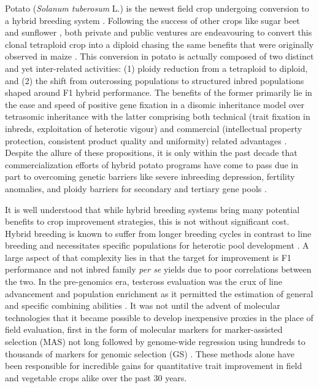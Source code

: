 Potato (\emph{Solanum tuberosum} L.) is the newest field crop
undergoing conversion to a hybrid breeding system
\autocite{DeVries2023,Jansky2016}. Following the success of other crops
like sugar beet \autocite{McGrath2018} and sunflower
\autocite{Dimitrijevic2018}, both private and public ventures are
endeavouring to convert this clonal tetraploid crop into a diploid
chasing the same benefits that were originally observed in maize
\autocite{Duvick1997}. This conversion in potato is actually composed of
two distinct and yet inter-related activities: (1) ploidy reduction from
a tetraploid to diploid, and (2) the shift from outcrossing populations
to structured inbred populations shaped around F1 hybrid performance.
The benefits of the former primarily lie in the ease and speed of
positive gene fixation in a disomic inheritance model over tetrasomic
inheritance \autocite{Hougas1958} with the latter comprising both
technical (trait fixation in inbreds, exploitation of heterotic vigour)
and commercial (intellectual property protection, consistent product
quality and uniformity) related advantages \autocite{Wright1980}.
Despite the allure of these propositions, it is only within the past
decade that commercialization efforts of hybrid potato programs have
come to pass due in part to overcoming genetic barriers like severe
inbreeding depression, fertility anomalies, and ploidy barriers for
secondary and tertiary gene pools
\autocite{Zhang2019,Endelman2016,Zhang2021}.

It is well understood that while hybrid breeding systems bring many
potential benefits to crop improvement strategies, this is not without
significant cost. Hybrid breeding is known to suffer from longer
breeding cycles in contrast to line breeding and necessitates specific
populations for heterotic pool development
\autocite{Labroo2021,Longin2013}. A large aspect of that complexity lies
in that the target for improvement is F1 performance and not inbred
family \emph{per se} yields due to poor correlations between the two. In
the pre-genomics era, testcross evaluation was the crux of line
advancement and population enrichment as it permitted the estimation of
general and specific combining abilities \autocite{Carangal1971}. It was
not until the advent of molecular technologies that it became possible
to develop inexpensive proxies in the place of field evaluation, first
in the form of molecular markers for marker-assisted selection (MAS) not
long followed by genome-wide regression using hundreds to thousands of
markers for genomic selection (GS) \autocite{Lande1990,Meuwissen2001}.
These methods alone have been responsible for incredible gains for
quantitative trait improvement in field and vegetable crops alike over
the past 30 years.

